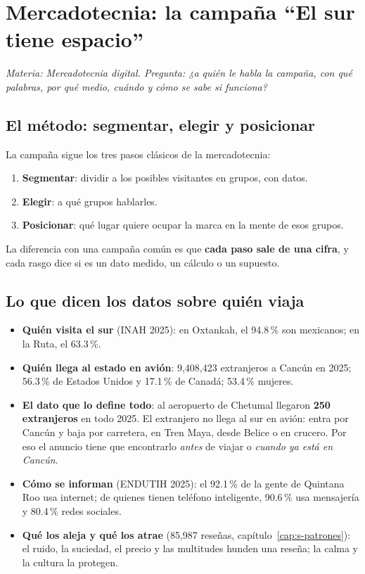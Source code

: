 \chapter{Mercadotecnia: la campaña ``El sur tiene espacio''}
\label{cap:s-campana}
\textit{Materia: Mercadotecnia digital. Pregunta: ¿a quién le habla la campaña, con qué palabras, por qué medio, cuándo y
cómo se sabe si funciona?}

\section{El método: segmentar, elegir y posicionar}
La campaña sigue los tres pasos clásicos de la mercadotecnia:
\begin{enumerate}
\item \textbf{Segmentar}: dividir a los posibles visitantes en grupos, con datos.
\item \textbf{Elegir}: a qué grupos hablarles.
\item \textbf{Posicionar}: qué lugar quiere ocupar la marca en la mente de esos grupos.
\end{enumerate}
La diferencia con una campaña común es que \textbf{cada paso sale de una cifra}, y cada rasgo dice si es un dato medido, un
cálculo o un supuesto.

\section{Lo que dicen los datos sobre quién viaja}
\begin{itemize}
\item \textbf{Quién visita el sur} (INAH 2025): en Oxtankah, el 94.8\,\% son mexicanos; en la Ruta, el 63.3\,\%.
\item \textbf{Quién llega al estado en avión}: 9,408,423 extranjeros a Cancún en 2025; 56.3\,\% de Estados Unidos y
  17.1\,\% de Canadá; 53.4\,\% mujeres.
\item \textbf{El dato que lo define todo}: al aeropuerto de Chetumal llegaron \textbf{250 extranjeros} en todo 2025. El
  extranjero no llega al sur en avión: entra por Cancún y baja por carretera, en Tren Maya, desde Belice o en crucero.
  Por eso el anuncio tiene que encontrarlo \emph{antes} de viajar o \emph{cuando ya está en Cancún}.
\item \textbf{Cómo se informan} (ENDUTIH 2025): el 92.1\,\% de la gente de Quintana Roo usa internet; de quienes tienen
  teléfono inteligente, 90.6\,\% usa mensajería y 80.4\,\% redes sociales.
\item \textbf{Qué los aleja y qué los atrae} (85,987 reseñas, capítulo~\ref{cap:s-patrones}): el ruido, la suciedad, el
  precio y las multitudes hunden una reseña; la calma y la cultura la protegen.
\end{itemize}

